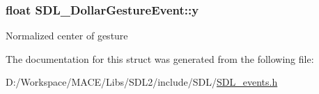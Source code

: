 \subsubsection[{\texorpdfstring{y}{y}}]{\setlength{\rightskip}{0pt plus 5cm}float S\+D\+L\+\_\+\+Dollar\+Gesture\+Event\+::y}\hypertarget{struct_s_d_l___dollar_gesture_event_a293b2303acc1cfc63c167c5525e6eab5}{}\label{struct_s_d_l___dollar_gesture_event_a293b2303acc1cfc63c167c5525e6eab5}
Normalized center of gesture 

The documentation for this struct was generated from the following file\+:\begin{DoxyCompactItemize}
\item 
D\+:/\+Workspace/\+M\+A\+C\+E/\+Libs/\+S\+D\+L2/include/\+S\+D\+L/\hyperlink{_s_d_l__events_8h}{S\+D\+L\+\_\+events.\+h}\end{DoxyCompactItemize}
